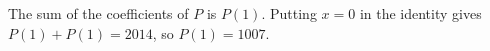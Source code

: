The sum of the coefficients of $P$ is $P(1)$. Putting $x=0$ in the identity gives $P(1)+P(1)=2014$, so $P(1)=\boxed{1007}$.
